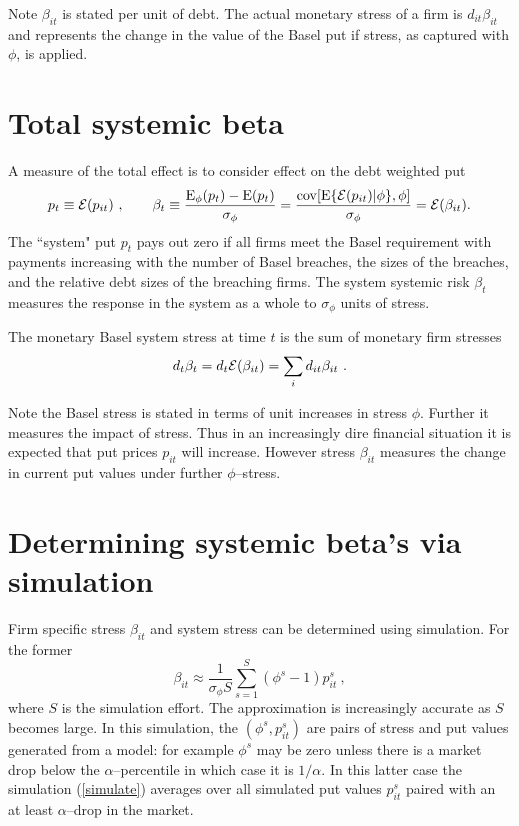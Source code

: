\documentclass[authoryear]{elsarticle}
\newcommand{\E}{\mathrm{E}}
\newcommand{\cov}{\mathrm{cov}}
\newcommand{\Ex}{{\cal E}}
\newcommand{\eref}[1]{(\ref{#1})}
\newcommand{\cq}{\ , \qquad}
\newcommand{\be}[1]{\begin{equation}\label{#1}}
\newcommand{\ee}{\end{equation}}
\begin{document}
Note $\beta_{it}$ is stated per unit of debt.   The actual monetary stress of a firm is 
$
d_{it}\beta_{it}
$
and represents the change in the value of the Basel put  if stress, as captured with $\phi$, is applied. 





\section{Total systemic beta}

A measure of the total effect is to consider effect on  the debt weighted put
\be{ssrisk}
p_{t}\equiv \Ex(p_{it}) \cq \beta_t\equiv\frac{\Es(p_{t}) -\E(p_{t})}{\sigma_\phi} = \frac{\cov[\E\{\Ex(p_{it})|\phi\},\phi]}{\sigma_\phi}=\Ex(\beta_{it}) .
\ee
The ``system" put $p_t$ pays out zero if all firms meet the Basel requirement with payments increasing with the number of Basel breaches, the sizes of the breaches, and the relative debt sizes of the breaching firms.  The system systemic risk $\beta_t$ measures the response in the system as a whole to $\sigma_\phi$ units of stress.

The monetary Basel system stress at time $t$ is the sum of monetary firm stresses
$$
d_t\beta_t = d_t\Ex(\beta_{it}) = \sum_i d_{it}\beta_{it}\ . 
$$

   Note the Basel stress is stated in terms of unit increases in stress $\phi$.   Further it measures the impact of stress.  Thus in an increasingly dire financial situation it is expected that put prices $p_{it}$ will increase.   However stress $\beta_{it}$ measures the  change in current put values  under  further $\phi$--stress.   


\section{Determining systemic beta's via simulation}

Firm specific stress $\beta_{it}$ and system stress  can be determined using simulation.   For the former
\be{simulate}
\beta_{it} \approx \frac{1}{\sigma_\phi S}\sum_{s=1}^S (\phi^s-1)p_{it}^s\ ,
\ee
where $S$ is the simulation effort.  The approximation is increasingly accurate as $S$ becomes large.  In this simulation, the $(\phi^s,p_{it}^s)$ are pairs of stress and put values generated from a model: for example $\phi^s$ may be zero unless there is a market drop below the $\alpha$--percentile in which case it is $1/\alpha$.   In this latter case the simulation \eref{simulate} averages over all simulated put values $p_{it}^s$ paired with an at least $\alpha$--drop in the market.
\end{document}
